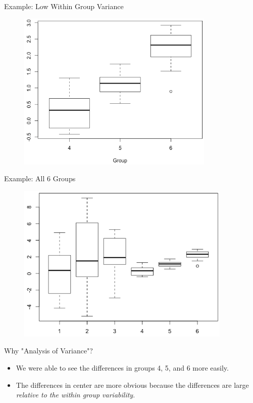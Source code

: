 \begin{frame}{Example: Low Within Group Variance}
    \begin{figure}
        \centering
        \includegraphics[height=3in]{images/lowvar.png}
    \end{figure}
\end{frame}

\begin{frame}{Example: All 6 Groups}
    \begin{figure}
        \centering
        \includegraphics[height=3in]{images/bothvar.png}
    \end{figure}
\end{frame}

\begin{frame}{Why "Analysis of Variance"?}
    \begin{itemize}
        \item We were able to see the differences in groups 4, 5, and 6 more easily.
        \item The differences in center are more obvious because the differences are large \textit{relative to the within group variability}.
    \end{itemize}
\end{frame}

